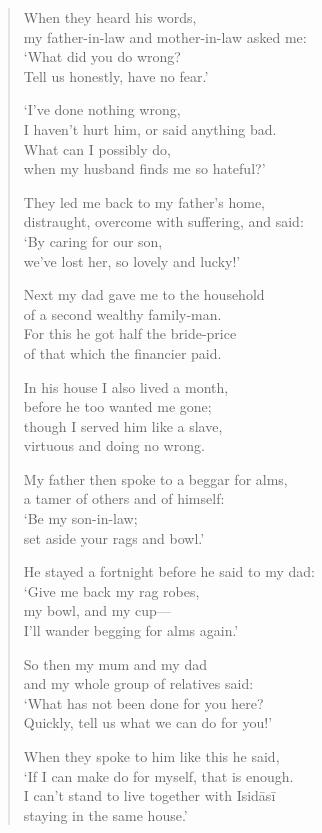 \documentclass[12pt,openany]{book}%
\begin{document}
\begin{verse}
When they heard his words, \\
my father-in-law and mother-in-law asked me: \\
‘What did you do wrong? \\
Tell us honestly, have no fear.’ 

‘I’ve done nothing wrong, \\
I haven’t hurt him, or said anything bad. \\
What can I possibly do, \\
when my husband finds me so hateful?’ 

They led me back to my father’s home, \\
distraught, overcome with suffering, and said: \\
‘By caring for our son, \\
we’ve lost her, so lovely and lucky!’ 

Next my dad gave me to the household \\
of a second wealthy family-man. \\
For this he got half the bride-price \\
of that which the financier paid. 

In his house I also lived a month, \\
before he too wanted me gone; \\
though I served him like a slave, \\
virtuous and doing no wrong. 

My father then spoke to a beggar for alms, \\
a tamer of others and of himself: \\
‘Be my son-in-law; \\
set aside your rags and bowl.’ 

He stayed a fortnight before he said to my dad: \\
‘Give me back my rag robes, \\
my bowl, and my cup—\\
I’ll wander begging for alms again.’ 

So then my mum and my dad \\
and my whole group of relatives said: \\
‘What has not been done for you here? \\
Quickly, tell us what we can do for you!’ 

When they spoke to him like this he said, \\
‘If I can make do for myself, that is enough. \\
I can’t stand to live together with \textsanskrit{Isidāsī} \\
staying in the same house.’ 


\end{verse}
\end{document}
